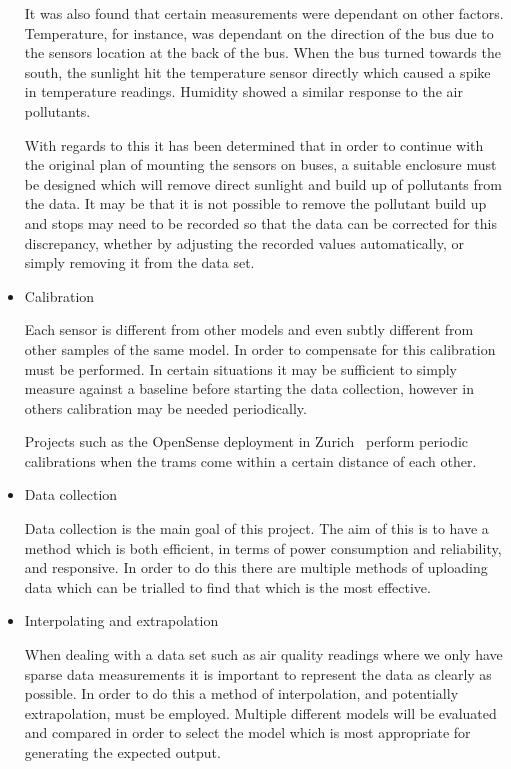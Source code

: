 \begin{itemize}
	It was also found that certain measurements were dependant on other factors. Temperature, for instance, was dependant on the direction of the bus due to the sensors location at the back of the bus. When the bus turned towards the south, the sunlight hit the temperature sensor directly which caused a spike in temperature readings. Humidity showed a similar response to the air pollutants. 

	With regards to this it has been determined that in order to continue with the original plan of mounting the sensors on buses, a suitable enclosure must be designed which will remove direct sunlight and build up of pollutants from the data. It may be that it is not possible to remove the pollutant build up and stops may need to be recorded so that the data can be corrected for this discrepancy, whether by adjusting the recorded values automatically, or simply removing it from the data set. 

	\item Calibration

	Each sensor is different from other models and even subtly different from other samples of the same model. In order to compensate for this calibration must be performed. In certain situations it may be sufficient to simply measure against a baseline before starting the data collection, however in others calibration may be needed periodically. 

	Projects such as the OpenSense deployment in Zurich~\cite{opensensezurich} perform periodic calibrations when the trams come within a certain distance of each other. 


	\item Data collection
	
	Data collection is the main goal of this project. The aim of this is to have a method which is both efficient, in terms of power consumption and reliability, and responsive. In order to do this there are multiple methods of uploading data which can be trialled to find that which is the most effective.

	\item Interpolating and extrapolation

	When dealing with a data set such as air quality readings where we only have sparse data measurements it is important to represent the data as clearly as possible. In order to do this a method of interpolation, and potentially extrapolation, must be employed. Multiple different models will be evaluated and compared in order to select the model which is most appropriate for generating the expected output.

\end{itemize}


